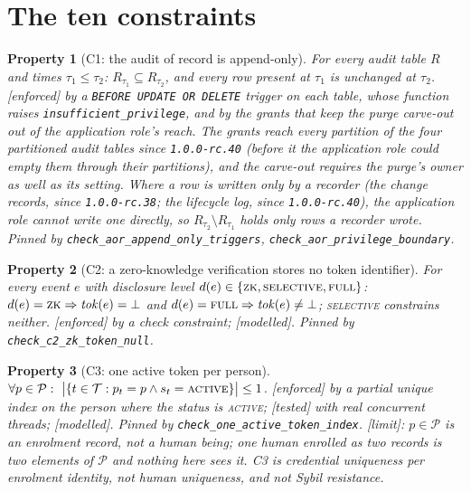 \documentclass[11pt]{article}
\newtheorem{property}{Property}
\theoremstyle{remark}
\newcommand{\Tok}{\mathcal T}
\newcommand{\Per}{\mathcal P}
\newcommand{\code}[1]{\texttt{#1}}
\newcommand{\emark}[1]{\textup{\textsf{[#1]}}}
\newcommand{\st}[1]{\textup{\textsc{#1}}}
\begin{document}
\section{The ten constraints}

\begin{property}[C1: the audit of record is append-only] For every audit table $R$ and times
$\tau_1\le\tau_2$: $R_{\tau_1}\subseteq R_{\tau_2}$, and every row present at $\tau_1$ is unchanged at
$\tau_2$. \emark{enforced} by a \texttt{BEFORE UPDATE OR DELETE} trigger on each table, whose function
raises \texttt{insufficient\_privilege}, and by the grants that keep the purge carve-out out of the
application role's reach. The grants reach every partition of the four partitioned audit tables
since \code{1.0.0-rc.40} (before it the application role could empty them through their partitions),
and the carve-out requires the purge's owner as well as its setting. Where a row is written only by a
recorder (the change records, since \code{1.0.0-rc.38}; the lifecycle log, since \code{1.0.0-rc.40}),
the application role cannot write one directly, so $R_{\tau_2}\setminus R_{\tau_1}$ holds only rows a
recorder wrote. Pinned by \code{check\_aor\_append\_only\_triggers}, \code{check\_aor\_privilege\_boundary}.
\end{property}

\begin{property}[C2: a zero-knowledge verification stores no token identifier] For every event
$e$ with disclosure level $d(e)\in\{\st{zk},\st{selective},\st{full}\}$:
$d(e)=\st{zk}\Rightarrow \mathit{tok}(e)=\bot$ and $d(e)=\st{full}\Rightarrow
\mathit{tok}(e)\neq\bot$; \st{selective} constrains neither. \emark{enforced} by a check
constraint; \emark{modelled}. Pinned by \code{check\_c2\_zk\_token\_null}.
\end{property}

\begin{property}[C3: one active token per person]
$\forall p\in\Per:\ \bigl|\{t\in\Tok: p_t=p\wedge s_t=\st{active}\}\bigr|\le 1$.
\emark{enforced} by a partial unique index on the person where the status is \st{active};
\emark{tested} with real concurrent threads; \emark{modelled}. Pinned by \code{check\_one\_active\_token\_index}.
\emark{limit}: $p\in\Per$ is an enrolment record, not a human being; one human enrolled as two
records is two elements of $\Per$ and nothing here sees it. C3 is credential uniqueness per
enrolment identity, not human uniqueness, and not Sybil resistance.
\end{property}
\end{document}
